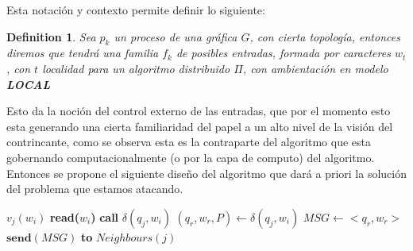 \documentclass[10pt]{report}
\newtheorem{definition}{Definition}
\begin{document}
    Esta notación y contexto permite definir lo siguiente:
    \theoremstyle{definition}
    \begin{definition}
        Sea $p_{k}$ un proceso de una gráfica $G$, con cierta topología, entonces
        diremos que tendrá una familia $f_{k}$ de posibles entradas, formada por caracteres $w_{t}$, con $t$ localidad para un algoritmo
        distribuido $\Pi$, con ambientación en modelo \textbf{LOCAL}

    \end{definition}
    Esto da la noción del control externo de las entradas, que por el momento esto esta generando
    una cierta familiaridad del papel a un alto nivel de la visión del contrincante, como se observa
    esta es la contraparte del algoritmo que esta gobernando computacionalmente (o por la capa de computo)
    del algoritmo.
    \hfill
    Entonces se propone el siguiente diseño del algoritmo que dará a priori
    la solución del problema que estamos atacando.

    \begin{algorithm}
        \caption{$Simula\char95Algo\char95TM(w)$}\label{alg:simula}
        \begin{algorithmic}
                  \STATE $v_{j}(w_{i})$
                  \STATE \textbf{read($w_{i}$)}
                     \STATE \textbf{call} $\delta(q_{j},w_{i})$
                     \STATE $(q_{r},w_{r},P)\gets \delta(q_{j},w_{i})$
                  \ENDWHILE
                  \ENDIF
                  \ELSE
                       \STATE $MSG\gets<q_{r},w_{r}>$
                       \STATE $\textbf{send}(MSG)$ \textbf{to} $Neighbours(j)$ 
               \ENDFOR
        \end{algorithmic}
    \end{algorithm}
    \space
\end{document}
